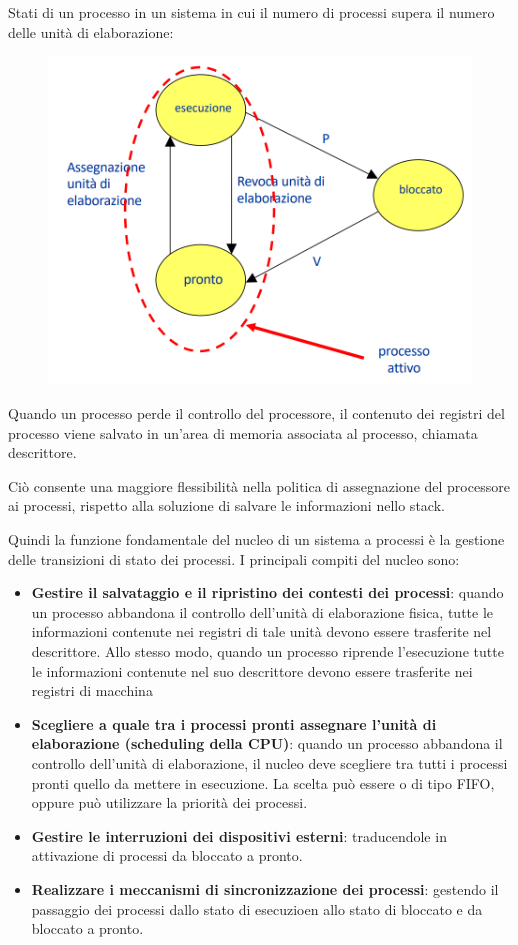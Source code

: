 \documentclass{article}
\begin{document}
\vspace{3mm}
Stati di un processo in un sistema in cui il numero di processi supera il numero delle unità di elaborazione:
\begin{figure}[htbp]
    \centering
    \includegraphics[width=0.70\columnwidth]{imgs/processi.PNG}
\end{figure}

Quando un processo perde il controllo del processore, il contenuto dei registri del processo viene salvato in un'area di memoria associata al processo, chiamata descrittore.

Ciò consente una maggiore flessibilità nella politica di assegnazione del processore ai processi, rispetto alla soluzione di salvare le informazioni nello stack.

\vspace{3mm}
Quindi la funzione fondamentale del nucleo di un sistema a processi è la gestione delle transizioni di stato dei processi. I principali compiti del nucleo sono:
\begin{itemize}
    \item \textbf{Gestire il salvataggio e il ripristino dei contesti dei processi}: quando un processo abbandona il controllo dell'unità di elaborazione fisica,
        tutte le informazioni contenute nei registri di tale unità devono essere trasferite nel descrittore. Allo stesso modo, quando un processo riprende l'esecuzione
        tutte le informazioni contenute nel suo descrittore devono essere trasferite nei registri di macchina
    \item \textbf{Scegliere a quale tra i processi pronti assegnare l'unità di elaborazione (scheduling della CPU)}: quando un processo abbandona il controllo
        dell'unità di elaborazione, il nucleo deve scegliere tra tutti i processi pronti quello da mettere in esecuzione. La scelta può essere o di tipo FIFO, oppure
        può utilizzare la priorità dei processi.
    \item \textbf{Gestire le interruzioni dei dispositivi esterni}: traducendole in attivazione di processi da bloccato a pronto.
    \item \textbf{Realizzare i meccanismi di sincronizzazione dei processi}: gestendo il passaggio dei processi dallo stato di esecuzioen allo stato di bloccato e da
        bloccato a pronto.
\end{itemize}
\end{document}
